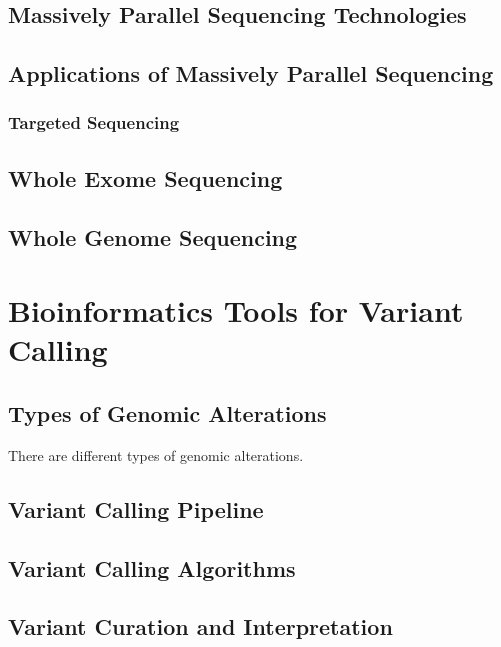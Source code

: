 \subsection{Massively Parallel Sequencing Technologies}

\subsection{Applications of Massively Parallel Sequencing}

\subsubsection{Targeted Sequencing}

\subsection{Whole Exome Sequencing}

\subsection{Whole Genome Sequencing}

\section{Bioinformatics Tools for Variant Calling}
\label{sec:BioinformaticsToolsforVariantCalling}

\subsection{Types of Genomic Alterations}
There are different types of genomic alterations.

\subsection{Variant Calling Pipeline}

\subsection{Variant Calling Algorithms}

\subsection{Variant Curation and Interpretation}

